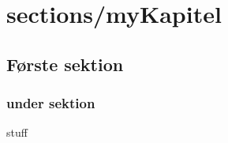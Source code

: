 %
\cfoot{\page\textbackslash \totalp} %
\setcounter{page}{1}
\chapter{sections/myKapitel}

\section{Første sektion}

\subsection{under sektion}

\cite{HTL}stuff
%